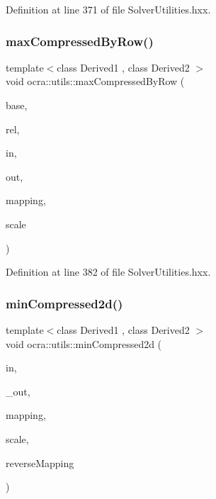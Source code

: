 Definition at line 371 of file Solver\+Utilities.\+hxx.

\hypertarget{namespaceocra_1_1utils_a0d2b985e493c0d62782921b92d0f92a9}{}\label{namespaceocra_1_1utils_a0d2b985e493c0d62782921b92d0f92a9} 
\subsubsection{\texorpdfstring{max\+Compressed\+By\+Row()}{maxCompressedByRow()}\hspace{0.1cm}{\footnotesize\ttfamily [2/2]}}
{\footnotesize\ttfamily template$<$class Derived1 , class Derived2 $>$ \\
void ocra\+::utils\+::max\+Compressed\+By\+Row (\begin{DoxyParamCaption}\item[{const \hyperlink{classocra_1_1Variable}{Variable} \&}]{base,  }\item[{const \hyperlink{classocra_1_1Variable}{Variable} \&}]{rel,  }\item[{const Matrix\+Base$<$ Derived1 $>$ \&}]{in,  }\item[{Matrix\+Base$<$ Derived2 $>$ const \&}]{out,  }\item[{std\+::vector$<$ int $>$ \&}]{mapping,  }\item[{double}]{scale }\end{DoxyParamCaption})\hspace{0.3cm}{\ttfamily [inline]}}



Definition at line 382 of file Solver\+Utilities.\+hxx.

\hypertarget{namespaceocra_1_1utils_aef09b232677b6a4a8d6177c04345f1d3}{}\label{namespaceocra_1_1utils_aef09b232677b6a4a8d6177c04345f1d3} 
\subsubsection{\texorpdfstring{min\+Compressed2d()}{minCompressed2d()}\hspace{0.1cm}{\footnotesize\ttfamily [1/2]}}
{\footnotesize\ttfamily template$<$class Derived1 , class Derived2 $>$ \\
void ocra\+::utils\+::min\+Compressed2d (\begin{DoxyParamCaption}\item[{const Matrix\+Base$<$ Derived1 $>$ \&}]{in,  }\item[{Matrix\+Base$<$ Derived2 $>$ const \&}]{\+\_\+out,  }\item[{const std\+::vector$<$ int $>$ \&}]{mapping,  }\item[{double}]{scale,  }\item[{bool}]{reverse\+Mapping }\end{DoxyParamCaption})\hspace{0.3cm}{\ttfamily [inline]}}



